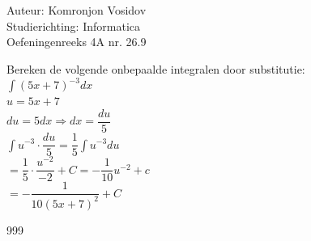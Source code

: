 \documentclass[a4paper]{article}
\newcommand{\dint}{\displaystyle\int}
\begin{document}
	
	\noindent \large Auteur: Komronjon Vosidov \\
	\noindent \large Studierichting: Informatica\\
	\noindent \large Oefeningenreeks 4A nr. 26.9\\
	
	\medskip
	
	\normalsize
    Bereken de volgende onbepaalde integralen door substitutie:\\

	
	$\dint (5x + 7)^{-3} dx $ \\
	
	$ u = 5x + 7 $ \\
	
	$du = 5dx \Rightarrow dx = \dfrac{du}{5}$ \\

	$\dint u^{-3} \cdot \dfrac{du}{5} = \dfrac{1}{5} \dint u^{-3} du$ \\

	$= \dfrac{1}{5} \cdot \dfrac{u^{-2}}{-2} +C= -\dfrac{1}{10} u^{-2}+c$ \\

	$= -\dfrac{1}{10(5x + 7)^2} + C$ \\

	
	
	
	
	
	\begin{thebibliography}{999}
	\end{thebibliography}		
\end{document}
